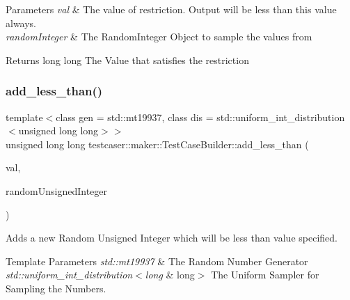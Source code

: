 \begin{DoxyParams}{Parameters}
{\em val} & The value of restriction. Output will be less than this value always. \\
\hline
{\em random\+Integer} & The Random\+Integer Object to sample the values from \\
\hline
\end{DoxyParams}
\begin{DoxyReturn}{Returns}
long long The Value that satisfies the restriction 
\end{DoxyReturn}
\mbox{\label{classtestcaser_1_1maker_1_1TestCaseBuilder_abc8a125ff2b991fc530a8263ba10ff3f}} 
\subsubsection{\texorpdfstring{add\_less\_than()}{add\_less\_than()}\hspace{0.1cm}{\footnotesize\ttfamily [2/2]}}
{\footnotesize\ttfamily template$<$class gen  = std\+::mt19937, class dis  = std\+::uniform\+\_\+int\+\_\+distribution$<$unsigned long long$>$$>$ \\
unsigned long long testcaser\+::maker\+::\+Test\+Case\+Builder\+::add\+\_\+less\+\_\+than (\begin{DoxyParamCaption}\item[{unsigned long long}]{val,  }\item[{\mbox{\hyperlink{classtestcaser_1_1maker_1_1types_1_1RandomUnsignedInteger}{types\+::\+Random\+Unsigned\+Integer}}$<$ gen, dis $>$ \&}]{random\+Unsigned\+Integer }\end{DoxyParamCaption})\hspace{0.3cm}{\ttfamily [inline]}}



Adds a new Random Unsigned Integer which will be less than value specified. 


\begin{DoxyTemplParams}{Template Parameters}
{\em std\+::mt19937} & The Random Number Generator \\
\hline
{\em std\+::uniform\+\_\+int\+\_\+distribution$<$long} & long$>$ The Uniform Sampler for Sampling the Numbers. \\
\hline
\end{DoxyTemplParams}

